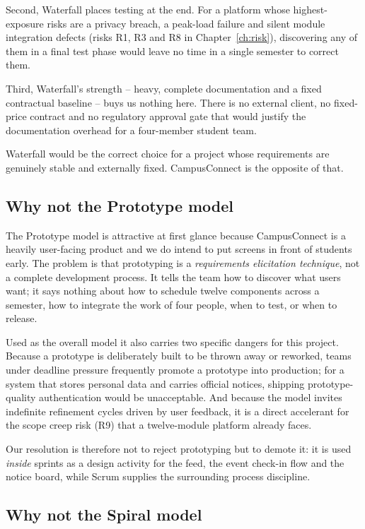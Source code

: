 \documentclass[11pt,a4paper]{report}
\begin{document}
Second, Waterfall places testing at the end. For a platform whose highest-exposure
risks are a privacy breach, a peak-load failure and silent module integration
defects (risks R1, R3 and R8 in Chapter~\ref{ch:risk}), discovering any of them in
a final test phase would leave no time in a single semester to correct them.

Third, Waterfall's strength -- heavy, complete documentation and a fixed
contractual baseline -- buys us nothing here. There is no external client, no
fixed-price contract and no regulatory approval gate that would justify the
documentation overhead for a four-member student team.

Waterfall would be the correct choice for a project whose requirements are
genuinely stable and externally fixed. CampusConnect is the opposite of that.

\subsection{Why not the Prototype model}

The Prototype model is attractive at first glance because CampusConnect is a
heavily user-facing product and we do intend to put screens in front of students
early. The problem is that prototyping is a \emph{requirements elicitation
technique}, not a complete development process. It tells the team how to discover
what users want; it says nothing about how to schedule twelve components across a
semester, how to integrate the work of four people, when to test, or when to
release.

Used as the overall model it also carries two specific dangers for this project.
Because a prototype is deliberately built to be thrown away or reworked, teams
under deadline pressure frequently promote a prototype into production; for a
system that stores personal data and carries official notices, shipping
prototype-quality authentication would be unacceptable. And because the model
invites indefinite refinement cycles driven by user feedback, it is a direct
accelerant for the scope creep risk (R9) that a twelve-module platform already
faces.

Our resolution is therefore not to reject prototyping but to demote it: it is used
\emph{inside} sprints as a design activity for the feed, the event check-in flow
and the notice board, while Scrum supplies the surrounding process discipline.

\subsection{Why not the Spiral model}
\end{document}
